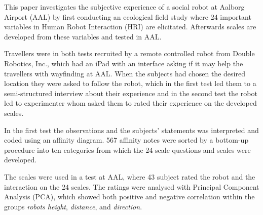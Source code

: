\label{Abstract}
This paper investigates the subjective experience of a social robot at Aalborg Airport (AAL) by first conducting an ecological field study where 24 important variables in Human Robot Interaction (HRI) are elicitated. Afterwards scales are developed from these variables and tested in AAL. 

Travellers were in both tests recruited by a remote controlled robot from Double Robotics, Inc., which had an iPad with an interface asking if it may help the travellers with wayfinding at AAL. When the subjects had chosen the desired location they were asked to follow the robot, which in the first test led them to a semi-structured interview about their experience and in the second test the robot led to experimenter whom asked them to rated their experience on the developed scales. 


In the first test the observations and the subjects' statements was interpreted and coded using an affinity diagram. 567 affinity notes were sorted by a bottom-up procedure into ten categories from which the 24 scale questions and scales were developed. 

The scales were used in a test at AAL, where 43 subject rated the robot and the interaction on the 24 scales. The ratings were analysed with Principal Component Analysis (PCA), which showed both positive and negative correlation within the groups \textit{robots height}, \textit{distance}, and \textit{direction}. 


%
%



